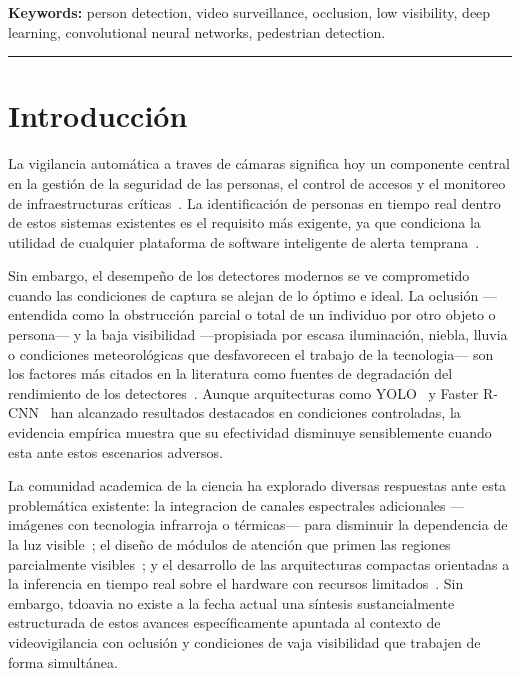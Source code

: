 \documentclass[12pt, a4paper]{article}
\begin{document}
\vspace{0.4em}
\noindent\textbf{Keywords:} person detection, video surveillance,
occlusion, low visibility, deep learning, convolutional neural
networks, pedestrian detection.

\noindent\rule{\linewidth}{1pt}
\vspace{1em}

\section{Introducci\'{o}n}

La vigilancia autom\'{a}tica a traves de c\'{a}maras significa hoy un
componente central en la gesti\'{o}n de la seguridad de las personas, el
control de accesos y el monitoreo de infraestructuras
cr\'{i}ticas~\cite{E24, E32}. La identificaci\'{o}n de personas en
tiempo real dentro de estos sistemas existentes es el requisito m\'{a}s exigente,
ya que condiciona la utilidad de cualquier plataforma de software inteligente de
alerta temprana~\cite{E12, E09}.

Sin embargo, el desempe\~{n}o de los detectores modernos se ve
comprometido cuando las condiciones de captura se alejan de lo
\'{o}ptimo e ideal. La oclusi\'{o}n ---entendida como la obstrucci\'{o}n
parcial o total de un individuo por otro objeto o persona--- y la baja
visibilidad ---propisiada por escasa iluminaci\'{o}n, niebla, lluvia o
condiciones meteorol\'{o}gicas que desfavorecen el trabajo de la tecnologia--- son los factores m\'{a}s
citados en la literatura como fuentes de degradaci\'{o}n del
rendimiento de los detectores~\cite{Dollar2012, E27, E11}. Aunque
arquitecturas como YOLO~\cite{Redmon2016} y Faster
R-CNN~\cite{Ren2015} han alcanzado resultados destacados en condiciones
controladas, la evidencia emp\'{i}rica muestra que su efectividad
disminuye sensiblemente cuando esta ante estos escenarios adversos.

La comunidad academica de la ciencia ha explorado diversas respuestas ante esta
problem\'{a}tica existente: la integracion de canales espectrales
adicionales ---im\'{a}genes con tecnologia infrarroja  o t\'{e}rmicas--- para disminuir
la dependencia de la luz visible~\cite{E35, E31, E19, E26}; el
dise\~{n}o de m\'{o}dulos de atenci\'{o}n que primen las regiones
parcialmente visibles~\cite{E25, E32, E23}; y el desarrollo de las
arquitecturas compactas orientadas a la inferencia en tiempo real sobre el
hardware con recursos limitados~\cite{E21, E23}. Sin embargo, tdoavia no
existe a la fecha actual una s\'{i}ntesis sustancialmente estructurada de estos avances
espec\'{i}ficamente apuntada al contexto de videovigilancia con
oclusi\'{o}n y condiciones de vaja visibilidad que trabajen de forma simult\'{a}nea.
\end{document}
